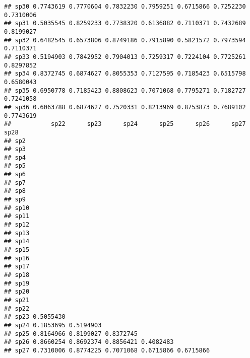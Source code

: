 \documentclass[
]{book}
\begin{document}
\begin{verbatim}
## sp30 0.7743619 0.7770604 0.7832230 0.7959251 0.6715866 0.7252230 0.7310006
## sp31 0.5035545 0.8259233 0.7738320 0.6136882 0.7110371 0.7432689 0.8199027
## sp32 0.6482545 0.6573806 0.8749186 0.7915890 0.5821572 0.7973594 0.7110371
## sp33 0.5194903 0.7842952 0.7904013 0.7259317 0.7224104 0.7725261 0.8297852
## sp34 0.8372745 0.6874627 0.8055353 0.7127595 0.7185423 0.6515798 0.6580043
## sp35 0.6950778 0.7185423 0.8808623 0.7071068 0.7795271 0.7182727 0.7241058
## sp36 0.6063788 0.6874627 0.7520331 0.8213969 0.8753873 0.7689102 0.7743619
##           sp22      sp23      sp24      sp25      sp26      sp27      sp28
## sp2                                                                       
## sp3                                                                       
## sp4                                                                       
## sp5                                                                       
## sp6                                                                       
## sp7                                                                       
## sp8                                                                       
## sp9                                                                       
## sp10                                                                      
## sp11                                                                      
## sp12                                                                      
## sp13                                                                      
## sp14                                                                      
## sp15                                                                      
## sp16                                                                      
## sp17                                                                      
## sp18                                                                      
## sp19                                                                      
## sp20                                                                      
## sp21                                                                      
## sp22                                                                      
## sp23 0.5055430                                                            
## sp24 0.1853695 0.5194903                                                  
## sp25 0.8164966 0.8199027 0.8372745                                        
## sp26 0.8660254 0.8692374 0.8856421 0.4082483                              
## sp27 0.7310006 0.8774225 0.7071068 0.6715866 0.6715866                    

\end{verbatim}
\end{document}

